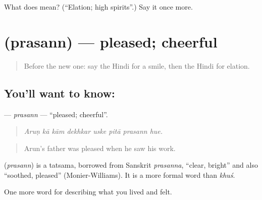 \begin{tcolorbox}[breakable,colback=teal!4,colframe=teal!35!black,title={Before you move on}]
What does  mean? (\textquotedblleft{}Elation; high spirits\textquotedblright{}.) Say it once more.
\end{tcolorbox}
\section[\texorpdfstring{\hi{प्रसन्न} (prasann)}{प्रसन्न (prasann)}]{ (prasann) — pleased; cheerful}

\label{lesson:HI-C453-prasann}



\begin{quote}
Before the new one: say the Hindi for a smile, then the Hindi for elation.
\end{quote}

\subsection*{You'll want to know: }
\textbf{} — \emph{prasann} — \textquotedblleft{}pleased; cheerful\textquotedblright{}.

\begin{quote}
       
\end{quote}

\begin{quote}
\emph{Aruṇ kā kām dekhkar uske pitā prasann hue.}
\end{quote}

\begin{quote}
Arun's father was pleased when he saw his work.
\end{quote}

\begin{cousinweb}
\textbf{} (\emph{prasann}) is a tatsama, borrowed from Sanskrit \emph{prasanna}, \textquotedblleft{}clear, bright\textquotedblright{} and also \textquotedblleft{}soothed, pleased\textquotedblright{} (Monier-Williams). It is a more formal word than \emph{khuś}.
\end{cousinweb}

\begin{grammarlens}[title={What you've built}]
One more word for describing what you lived and felt.
\end{grammarlens}

